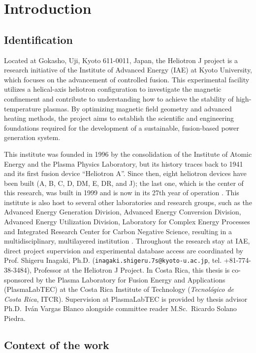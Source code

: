 \section{Introduction}
\subsection{Identification}
Located at Gokasho, Uji, Kyoto 611-0011, Japan, the Heliotron J project is a research initiative of the Institute of Advanced Energy (IAE) at Kyoto University, which focuses on the advancement of controlled fusion. This experimental facility utilizes a helical-axis heliotron configuration to investigate the magnetic confinement and contribute to understanding how to achieve the stability of high-temperature plasmas. By optimizing magnetic field geometry and advanced heating methods, the project aims to establish the scientific and engineering foundations required for the development of a sustainable, fusion-based power generation system.

This institute was founded in 1996 by the consolidation of the Institute of Atomic Energy and the Plasma Physics Laboratory, but its history traces back to 1941 and its first fusion device ``Heliotron A''. Since then, eight heliotron devices have been built (A, B, C, D, DM, E, DR, and J); the last one, which is the center of this research, was built in 1999 and is now in its 27th year of operation \cite{IAEhistory}. This institute is also host to several other laboratories and research groups, such as the Advanced Energy Generation Division, Advanced Energy Conversion Division, Advanced Energy Utilization Division, Laboratory for Complex Energy Processes and Integrated Research Center for Carbon Negative Science, resulting in a multidisciplinary, multilayered institution \cite{IAEorganization}. Throughout the research stay at IAE, direct project supervision and experimental database access are coordinated by Prof. Shigeru Inagaki, Ph.D. (\texttt{inagaki.shigeru.7s@kyoto-u.ac.jp}, tel. +81-774-38-3484), Professor at the Heliotron J Project. In Costa Rica, this thesis is co-sponsored by the Plasma Laboratory for Fusion Energy and Applications (PlasmaLabTEC) at the Costa Rica Institute of Technology (\emph{Tecnol\'ogico de Costa Rica}, ITCR). Supervision at PlasmaLabTEC is provided by thesis advisor Ph.D.~Iv\'an Vargas Blanco alongside committee reader M.Sc.~Ricardo Solano Piedra.

\subsection{Context of the work}

